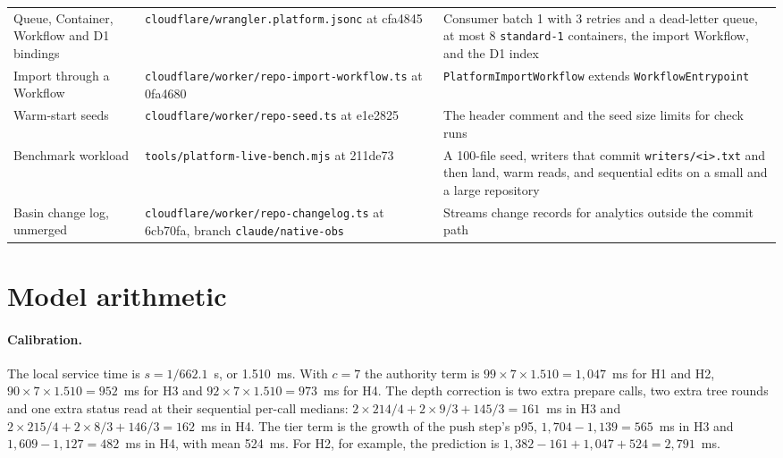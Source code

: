 \documentclass[11pt,letterpaper]{article}
\theoremstyle{definition}
\theoremstyle{remark}
\begin{document}
{\begin{longtable}{@{}L{3.0cm}L{5.3cm}L{7.2cm}@{}}
Queue, Container, Workflow and D1 bindings & \nolinkurl{cloudflare/wrangler.platform.jsonc} \newline at cfa4845 & Consumer batch 1 with 3 retries and a dead-letter queue, at most 8 \texttt{standard-1} containers, the import Workflow, and the D1 index \\
Import through a Workflow & \nolinkurl{cloudflare/worker/repo-import-workflow.ts} \newline at 0fa4680 & \texttt{PlatformImportWorkflow} extends \texttt{WorkflowEntrypoint} \\
Warm-start seeds & \nolinkurl{cloudflare/worker/repo-seed.ts} \newline at e1e2825 & The header comment and the seed size limits for check runs \\
Benchmark workload & \nolinkurl{tools/platform-live-bench.mjs} \newline at 211de73 & A 100-file seed, writers that commit \texttt{writers/<i>.txt} and then land, warm reads, and sequential edits on a small and a large repository \\
Basin change log, unmerged & \nolinkurl{cloudflare/worker/repo-changelog.ts} \newline at 6cb70fa, branch \nolinkurl{claude/native-obs} & Streams change records for analytics outside the commit path \\
\end{longtable}
}

\section{Model arithmetic}
\label{app:sgoc:arithmetic}

\paragraph{Calibration.} The local service time is $s = 1/662.1$~s, or 1.510~ms. %
With $c = 7$ the authority term is $99 \times 7 \times 1.510 = 1{,}047$~ms for H1 and H2, $90 \times 7 \times 1.510 = 952$~ms for H3 and $92 \times 7 \times 1.510 = 973$~ms for H4. %
The depth correction is two extra prepare calls, two extra tree rounds and one extra status read at their sequential per-call medians: $2 \times 214/4 + 2 \times 9/3 + 145/3 = 161$~ms in H3 and $2 \times 215/4 + 2 \times 8/3 + 146/3 = 162$~ms in H4. %
The tier term is the growth of the push step's p95, $1{,}704 - 1{,}139 = 565$~ms in H3 and $1{,}609 - 1{,}127 = 482$~ms in H4, with mean 524~ms. %
For H2, for example, the prediction is $1{,}382 - 161 + 1{,}047 + 524 = 2{,}791$~ms. %
\end{document}
